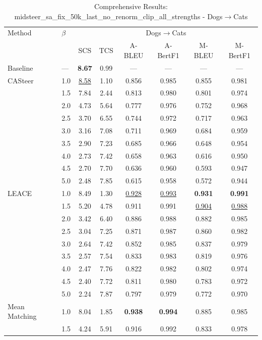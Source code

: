 \begin{table}[htbp]
\centering
\caption{Comprehensive Results: midsteer\_sa\_fix\_50k\_last\_no\_renorm\_clip\_all\_strengths - Dogs$\to$Cats}
\label{tab:single_experiment_table_with_clipping_dogs_to_cats}
\begin{tabular}{l|l|cccccc|}
\hline
Method & $\beta$ & \multicolumn{6}{c|}{Dogs$\rightarrow$Cats} \\
 &  & SCS & TCS & A-BLEU & A-BertF1 & M-BLEU & M-BertF1 \\
\hline
Baseline & — & \textbf{8.67} & 0.99 & — & — & — & — \\
\hline
CASteer & 1.0 & \underline{8.58} & 1.10 & 0.856 & 0.985 & 0.855 & 0.981 \\
 & 1.5 & 7.84 & 2.44 & 0.813 & 0.980 & 0.801 & 0.974 \\
 & 2.0 & 4.73 & 5.64 & 0.777 & 0.976 & 0.752 & 0.968 \\
 & 2.5 & 3.70 & 6.55 & 0.744 & 0.972 & 0.717 & 0.963 \\
 & 3.0 & 3.16 & 7.08 & 0.711 & 0.969 & 0.684 & 0.959 \\
 & 3.5 & 2.90 & 7.23 & 0.685 & 0.966 & 0.648 & 0.954 \\
 & 4.0 & 2.73 & 7.42 & 0.658 & 0.963 & 0.616 & 0.950 \\
 & 4.5 & 2.70 & 7.70 & 0.636 & 0.960 & 0.593 & 0.947 \\
 & 5.0 & 2.48 & 7.85 & 0.615 & 0.958 & 0.572 & 0.944 \\
\hline
LEACE & 1.0 & 8.49 & 1.30 & \underline{0.928} & \underline{0.993} & \textbf{0.931} & \textbf{0.991} \\
 & 1.5 & 5.20 & 4.78 & 0.911 & 0.991 & \underline{0.904} & \underline{0.988} \\
 & 2.0 & 3.42 & 6.40 & 0.886 & 0.988 & 0.882 & 0.985 \\
 & 2.5 & 3.04 & 7.25 & 0.871 & 0.987 & 0.860 & 0.982 \\
 & 3.0 & 2.64 & 7.42 & 0.852 & 0.985 & 0.837 & 0.979 \\
 & 3.5 & 2.57 & 7.54 & 0.833 & 0.983 & 0.819 & 0.976 \\
 & 4.0 & 2.47 & 7.76 & 0.822 & 0.982 & 0.802 & 0.974 \\
 & 4.5 & 2.40 & 7.72 & 0.811 & 0.980 & 0.783 & 0.972 \\
 & 5.0 & 2.24 & 7.87 & 0.797 & 0.979 & 0.772 & 0.970 \\
\hline
Mean Matching & 1.0 & 8.04 & 1.85 & \textbf{0.938} & \textbf{0.994} & 0.885 & 0.985 \\
 & 1.5 & 4.24 & 5.91 & 0.916 & 0.992 & 0.833 & 0.978 \\

\end{tabular}
\end{table}
